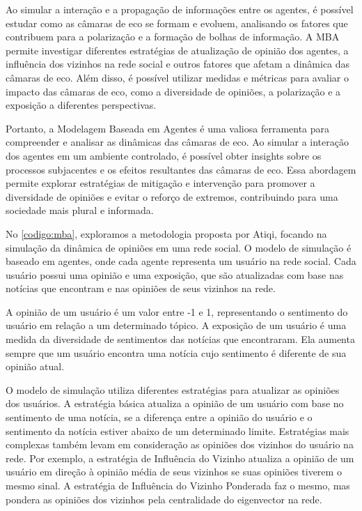 Ao simular a interação e a propagação de informações entre os agentes, é possível estudar como as câmaras de eco se formam e evoluem, analisando os fatores que contribuem para a polarização e a formação de bolhas de informação. A MBA permite investigar diferentes estratégias de atualização de opinião dos agentes, a influência dos vizinhos na rede social e outros fatores que afetam a dinâmica das câmaras de eco. Além disso, é possível utilizar medidas e métricas para avaliar o impacto das câmaras de eco, como a diversidade de opiniões, a polarização e a exposição a diferentes perspectivas.

Portanto, a Modelagem Baseada em Agentes é uma valiosa ferramenta para compreender e analisar as dinâmicas das câmaras de eco. Ao simular a interação dos agentes em um ambiente controlado, é possível obter insights sobre os processos subjacentes e os efeitos resultantes das câmaras de eco. Essa abordagem permite explorar estratégias de mitigação e intervenção para promover a diversidade de opiniões e evitar o reforço de extremos, contribuindo para uma sociedade mais plural e informada.

No \autoref{codigo:mba}, exploramos a metodologia proposta por Atiqi, focando na simulação da dinâmica de opiniões em uma rede social. O modelo de simulação é baseado em agentes, onde cada agente representa um usuário na rede social. Cada usuário possui uma opinião e uma exposição, que são atualizadas com base nas notícias que encontram e nas opiniões de seus vizinhos na rede.

A opinião de um usuário é um valor entre -1 e 1, representando o sentimento do usuário em relação a um determinado tópico. A exposição de um usuário é uma medida da diversidade de sentimentos das notícias que encontraram. Ela aumenta sempre que um usuário encontra uma notícia cujo sentimento é diferente de sua opinião atual.

O modelo de simulação utiliza diferentes estratégias para atualizar as opiniões dos usuários. A estratégia básica atualiza a opinião de um usuário com base no sentimento de uma notícia, se a diferença entre a opinião do usuário e o sentimento da notícia estiver abaixo de um determinado limite. Estratégias mais complexas também levam em consideração as opiniões dos vizinhos do usuário na rede. Por exemplo, a estratégia de Influência do Vizinho atualiza a opinião de um usuário em direção à opinião média de seus vizinhos se suas opiniões tiverem o mesmo sinal. A estratégia de Influência do Vizinho Ponderada faz o mesmo, mas pondera as opiniões dos vizinhos pela centralidade do eigenvector na rede.

